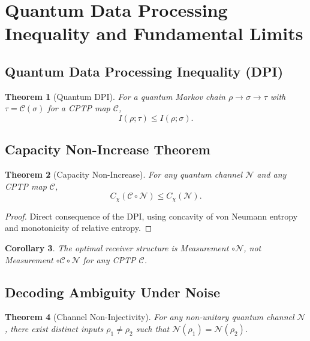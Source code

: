 \documentclass[12pt]{article}
\newtheorem{theorem}{Theorem}[section]
\newtheorem{corollary}[theorem]{Corollary}
\begin{document}
\section{Quantum Data Processing Inequality and Fundamental Limits}
\subsection{Quantum Data Processing Inequality (DPI)}
\begin{theorem}[Quantum DPI]
    For a quantum Markov chain $\rho \to \sigma \to \tau$ with $\tau = \mathcal{C}(\sigma)$ for a CPTP map $\mathcal{C}$,
    \begin{equation}
        I(\rho; \tau) \leq I(\rho; \sigma).
    \end{equation}
\end{theorem}

\subsection{Capacity Non-Increase Theorem}
\begin{theorem}[Capacity Non-Increase]
    For any quantum channel $\mathcal{N}$ and any CPTP map $\mathcal{C}$,
    \begin{equation}
        C_\chi(\mathcal{C} \circ \mathcal{N}) \leq C_\chi(\mathcal{N}).
    \end{equation}
\end{theorem}
\begin{proof}
    Direct consequence of the DPI, using concavity of von Neumann entropy and monotonicity of relative entropy.
\end{proof}

\begin{corollary}
    The optimal receiver structure is Measurement $\circ \mathcal{N}$, not Measurement $\circ \mathcal{C} \circ \mathcal{N}$ for any CPTP $\mathcal{C}$.
\end{corollary}

\subsection{Decoding Ambiguity Under Noise}
\begin{theorem}[Channel Non-Injectivity]
    For any non-unitary quantum channel $\mathcal{N}$, there exist distinct inputs $\rho_1 \neq \rho_2$ such that $\mathcal{N}(\rho_1) = \mathcal{N}(\rho_2)$.
\end{theorem}
\end{document}
